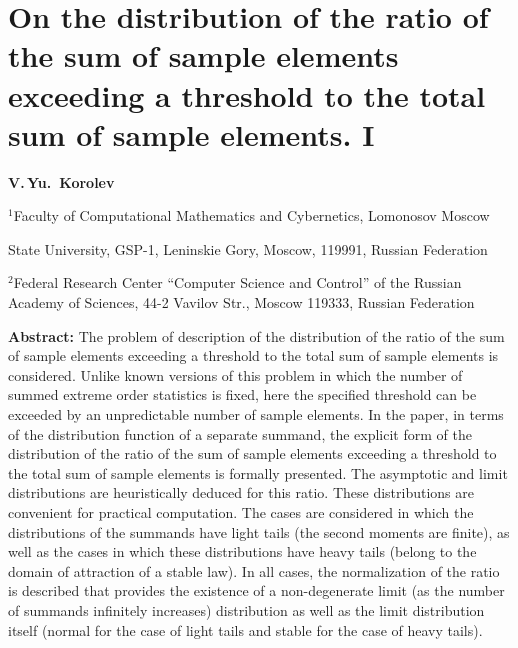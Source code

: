 \documentclass[14pt,a4paper]{extarticle}
\begin{document}
\section*{On the distribution of the ratio of the sum of sample elements exceeding a threshold to the total sum of sample elements. I}



\large{\bfseries V.\,Yu.~Korolev}

\bigskip



\small





$^1$Faculty of Computational Mathematics and Cybernetics, Lomonosov Moscow

State University, GSP-1, Leninskie Gory, Moscow, 119991, Russian Federation



$^2$Federal Research Center ``Computer Science and Control'' of the Russian Academy of Sciences, 44-2 Vavilov Str., Moscow 119333, Russian Federation





\bigskip



\bigskip



{\bf Abstract:} The problem of description of the distribution of the ratio of the sum of sample elements exceeding a threshold to the total sum of sample elements is considered. Unlike known versions of this problem in which the number of summed extreme order statistics is fixed, here the specified threshold can be exceeded by an unpredictable number of sample elements. In the paper, in terms of the distribution function of a separate summand, the explicit form of the distribution of the ratio of the sum of sample elements exceeding a threshold to the total sum of sample elements is formally presented. The asymptotic and limit distributions are heuristically deduced for this ratio. These distributions are convenient for practical computation. The cases are considered in which the distributions of the summands have light tails (the second moments are finite), as well as the cases in which these distributions have heavy tails (belong to the domain of attraction of a stable law). In all cases, the normalization of the ratio is described that provides the existence of a non-degenerate limit (as the number of summands infinitely increases) distribution as well as the limit distribution itself (normal for the case of light tails and stable for the case of heavy tails).
\end{document}
